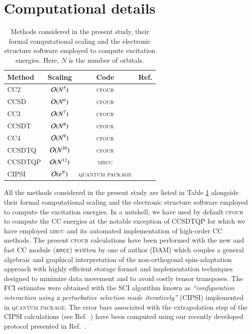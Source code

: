 \documentclass[aip,jcp,reprint,noshowkeys,superscriptaddress]{revtex4-1}
\newcommand{\QP}{\textsc{quantum package}}
\newcommand{\MRCC}{\textsc{mrcc}}
\newcommand{\CFOUR}{\textsc{cfour}}
\begin{document}
\section{Computational details}

\begin{table}
	\caption{Methods considered in the present study, their formal computational scaling and the electronic structure software employed to compute excitation energies.
	Here, $N$ is the number of orbitals.
	\label{tab:scaling}}
	\begin{ruledtabular}
	\begin{tabular}{lccc}
		Method	&	Scaling					&	Code		&	Ref.					\\
		\hline
		CC2			&	$\order*{N^{5}}$	&	\CFOUR		&	\onlinecite{cfour}		\\
		CCSD		&	$\order*{N^{6}}$	&	\CFOUR		&	\onlinecite{cfour}		\\
		CC3			&	$\order*{N^{7}}$	&	\CFOUR		&	\onlinecite{cfour}		\\
		CCSDT		&	$\order*{N^{8}}$	&	\CFOUR		&	\onlinecite{cfour}		\\
		CC4			&	$\order*{N^{9}}$	&	\CFOUR		&	\onlinecite{cfour}		\\
		CCSDTQ		&	$\order*{N^{10}}$	&	\CFOUR		&	\onlinecite{cfour}		\\
		CCSDTQP		&	$\order*{N^{12}}$	&	\MRCC		&	\onlinecite{mrcc}		\\	
		CIPSI		&	$\order*{e^{N}}$	&	\QP			&	\onlinecite{qp2}		\\
	\end{tabular}
	\end{ruledtabular}
\end{table}

All the methods considered in the present study are listed in Table \ref{tab:scaling} alongside their formal computational scaling and the electronic structure software employed to compute the excitation energies.
In a nutshell, we have used by default {\CFOUR} \cite{cfour} to compute the CC energies at the notable exception of CCSDTQP for which we have employed {\MRCC} and its automated implementation of high-order CC methods. \cite{mrcc}
The present {\CFOUR} calculations have been performed with the new and fast CC module (\texttt{xncc})  written by one of author (DAM) which couples a general algebraic
and graphical interpretation of the non-orthogonal spin-adaptation approach with highly efficient storage format and implementation techniques designed to minimize data movement and to avoid costly tensor transposes. \cite{Matthews_2015b}
The FCI estimates were obtained with the SCI algorithm known as \textit{``configuration interaction using a perturbative selection made iteratively''} (CIPSI) implemented in {\QP}. \cite{qp2}
The error bars associated with the extrapolation step of the CIPSI calculations (see Ref.~) have been computed using our recently developed protocol presented in Ref.~.
\end{document}
